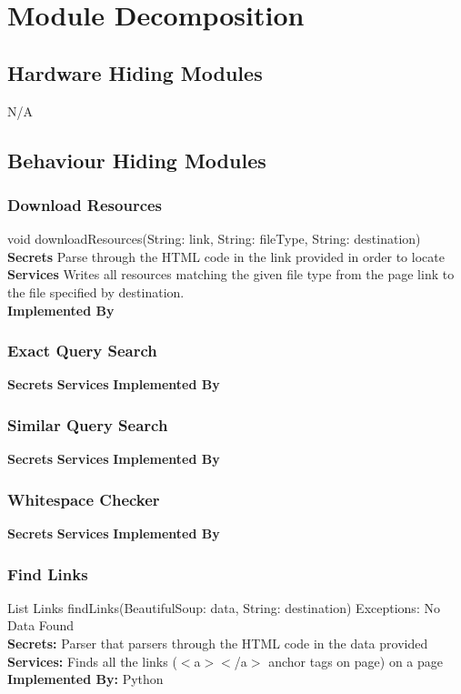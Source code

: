\documentclass[titlepage]{article}
\begin{document}
\section{Module Decomposition}
\subsection{Hardware Hiding Modules}
N/A
\subsection{Behaviour Hiding Modules}
\subsubsection{Download Resources}
void downloadResources(String: link, String: fileType, String: destination)\\
\textbf{Secrets}
Parse through the HTML code in the link provided in order to locate \\
\textbf{Services}
Writes all resources matching the given file type from the page link to the file specified by destination.\\
\textbf{Implemented By}

\subsubsection{Exact Query Search}
\textbf{Secrets}
\textbf{Services}
\textbf{Implemented By}
\subsubsection{Similar Query Search}
\textbf{Secrets}
\textbf{Services}
\textbf{Implemented By}
\subsubsection{Whitespace Checker}
\textbf{Secrets}
\textbf{Services}
\textbf{Implemented By}

\subsubsection{Find Links}
List Links findLinks(BeautifulSoup: data, String: destination) Exceptions: No Data Found\\
\textbf{Secrets:}
Parser that parsers through the HTML code in the data provided\\
\textbf{Services:}
Finds all the links ($<$a$>$$<$/a$>$ anchor tags on page) on a page \\
\textbf{Implemented By:} Python
\end{document}

